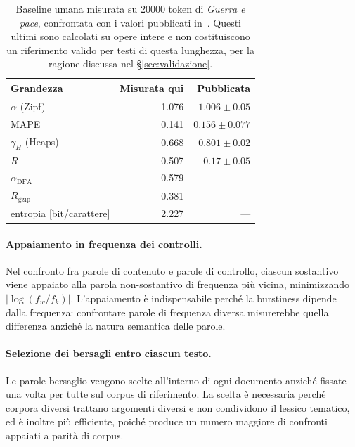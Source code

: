 \begin{table}[htbp]
\centering
\small
\begin{tabular}{@{}lrr@{}}
\toprule
Grandezza & Misurata qui & Pubblicata \\
\midrule
$\alpha$ (Zipf)                 & 1.076  & $1.006 \pm 0.05$ \\
MAPE                            & 0.141  & $0.156 \pm 0.077$ \\
$\gamma_H$ (Heaps)              & 0.668  & $0.801 \pm 0.02$ \\
$R$                             & 0.507  & $0.17 \pm 0.05$ \\
$\alpha_{\mathrm{DFA}}$         & 0.579  & --- \\
$R_{\mathrm{gzip}}$             & 0.381  & --- \\
entropia [bit/carattere]        & 2.227  & --- \\
\bottomrule
\end{tabular}
\caption{Baseline umana misurata su \num{20000} token di \emph{Guerra e pace},
confrontata con i valori pubblicati in~\cite{mikhaylovskiy2025zipf}. Questi
ultimi sono calcolati su opere intere e non costituiscono un riferimento valido
per testi di questa lunghezza, per la ragione discussa nel
§\ref{sec:validazione}.}
\label{tab:baseline}
\end{table}

\paragraph{Appaiamento in frequenza dei controlli.}
Nel confronto fra parole di contenuto e parole di controllo, ciascun sostantivo
viene appaiato alla parola non-sostantivo di frequenza più vicina, minimizzando
$\lvert\log(f_w/f_k)\rvert$. L'appaiamento è indispensabile perché la burstiness
dipende dalla frequenza: confrontare parole di frequenza diversa misurerebbe
quella differenza anziché la natura semantica delle parole.

\paragraph{Selezione dei bersagli entro ciascun testo.}
Le parole bersaglio vengono scelte all'interno di ogni documento anziché fissate
una volta per tutte sul corpus di riferimento. La scelta è necessaria perché
corpora diversi trattano argomenti diversi e non condividono il lessico
tematico, ed è inoltre più efficiente, poiché produce un numero maggiore di
confronti appaiati a parità di corpus.

